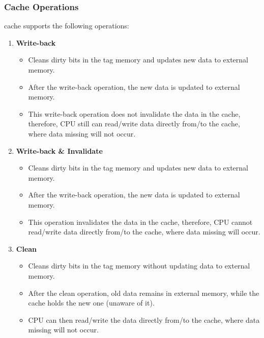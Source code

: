 \documentclass[main\_\_EN.tex]{subfiles}
\begin{document}
\subsubsection{Cache Operations}

\chipname{} cache supports the following operations:

\begin{enumerate}
\item \textbf{Write-back}
\begin{itemize}
    \item Cleans dirty bits in the tag memory and updates new data to external memory.
    \item After the write-back operation, the new data is updated to external memory.
    \item This write-back operation does not invalidate the data in the cache, therefore, CPU still can read/write data directly from/to the cache, where data missing will not occur.
\end{itemize}

\item \textbf{Write-back \& Invalidate}
\begin{itemize}
    \item Cleans dirty bits in the tag memory and updates new data to external memory.
    \item After the write-back operation, the new data is updated to external memory.
    \item This operation invalidates the data in the cache, therefore, CPU cannot read/write data directly from/to the cache, where data missing will occur.
\end{itemize}


\item \textbf{Clean}
\begin{itemize}
    \item Cleans dirty bits in the tag memory without updating data to external memory.
    \item After the clean operation, old data remains in external memory, while the cache holds the new one (unaware of it).
    \item CPU can then read/write the data directly from/to the cache, where data missing will not occur.
\end{itemize}


\end{enumerate}
\end{document}
